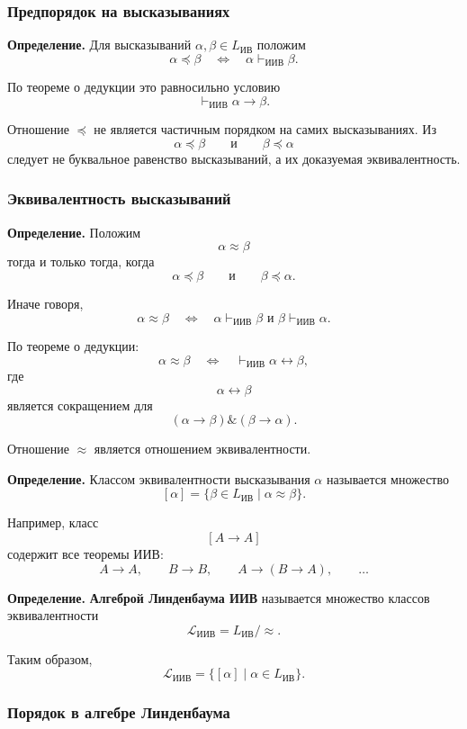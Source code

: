 \documentclass[12pt,a4paper,oneside,openany]{book}
\theoremstyle{definition}
\theoremstyle{plain}
\theoremstyle{remark}
\begin{document}
\subsubsection{Предпорядок на высказываниях}

\textbf{Определение.}
Для высказываний \(\alpha,\beta\in L_{\mathrm{ИВ}}\) положим
\[
\alpha\preccurlyeq\beta
\quad\Longleftrightarrow\quad
\alpha\vdash_{\mathrm{ИИВ}}\beta.
\]

По теореме о дедукции это равносильно условию
\[
\vdash_{\mathrm{ИИВ}}\alpha\to\beta.
\]


Отношение \(\preccurlyeq\) не является частичным порядком на самих
высказываниях. Из
\[
\alpha\preccurlyeq\beta
\qquad\text{и}\qquad
\beta\preccurlyeq\alpha
\]
следует не буквальное равенство высказываний, а их доказуемая
эквивалентность.

\subsubsection{Эквивалентность высказываний}

\textbf{Определение.}
Положим
\[
\alpha\approx\beta
\]
тогда и только тогда, когда
\[
\alpha\preccurlyeq\beta
\qquad\text{и}\qquad
\beta\preccurlyeq\alpha.
\]

Иначе говоря,
\[
\alpha\approx\beta
\quad\Longleftrightarrow\quad
\alpha\vdash_{\mathrm{ИИВ}}\beta
\text{ и }
\beta\vdash_{\mathrm{ИИВ}}\alpha.
\]

По теореме о дедукции:
\[
\alpha\approx\beta
\quad\Longleftrightarrow\quad
\vdash_{\mathrm{ИИВ}}\alpha\leftrightarrow\beta,
\]
где
\[
\alpha\leftrightarrow\beta
\]
является сокращением для
\[
(\alpha\to\beta)
\mathbin{\&}
(\beta\to\alpha).
\]

Отношение \(\approx\) является отношением эквивалентности.

\textbf{Определение.}
Классом эквивалентности высказывания \(\alpha\) называется множество
\[
[\alpha]
=
\{\beta\in L_{\mathrm{ИВ}}\mid\alpha\approx\beta\}.
\]

Например, класс
\[
[A\to A]
\]
содержит все теоремы ИИВ:
\[
A\to A,
\qquad
B\to B,
\qquad
A\to(B\to A),
\qquad
\ldots
\]

\textbf{Определение.}
\textbf{Алгеброй Линденбаума ИИВ} называется множество классов
эквивалентности
\[
\mathcal L_{\mathrm{ИИВ}}
=
L_{\mathrm{ИВ}}/{\approx}.
\]

Таким образом,
\[
\mathcal L_{\mathrm{ИИВ}}
=
\{[\alpha]\mid\alpha\in L_{\mathrm{ИВ}}\}.
\]

\subsubsection{Порядок в алгебре Линденбаума}
\end{document}

